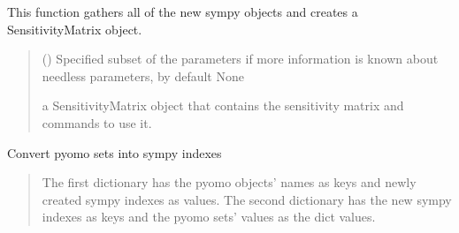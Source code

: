 \documentclass[letterpaper,10pt,english]{sphinxmanual}
\begin{document}
\begin{fulllineitems}
\begin{fulllineitems}
\label{\detokenize{src.sensitivity.faster_sensitivity:src.sensitivity.faster_sensitivity.AutoSympy.get_sensitivity_matrix}}
\pysigstartsignatures
\pysiglinewithargsret
{}
{}
{}
\pysigstopsignatures
\sphinxAtStartPar
This function gathers all of the new sympy objects and creates a SensitivityMatrix object.
\begin{quote}\begin{description}
\sphinxAtStartPar
{} (\sphinxstyleliteralemphasis{\sphinxupquote{, }}) \textendash{} Specified subset of the parameters if more information is known about needless parameters, by default None

\sphinxAtStartPar
a SensitivityMatrix object that contains the sensitivity matrix and commands to use it.

\sphinxAtStartPar
{\hyperref[\detokenize{src.sensitivity.faster_sensitivity:src.sensitivity.faster_sensitivity.SensitivityMatrix}]{}}

\end{description}\end{quote}

\end{fulllineitems}


\begin{fulllineitems}
\label{\detokenize{src.sensitivity.faster_sensitivity:src.sensitivity.faster_sensitivity.AutoSympy.get_sets}}
\pysigstartsignatures
\pysiglinewithargsret
{}
{}
{}
\pysigstopsignatures
\sphinxAtStartPar
Convert pyomo sets into sympy indexes
\begin{quote}\begin{description}
\sphinxAtStartPar
The first dictionary has the pyomo objects’ names as keys and newly created sympy indexes as values.
The second dictionary has the new sympy indexes as keys and the pyomo sets’ values as the dict values.


\end{description}
\end{quote}
\end{fulllineitems}
\end{fulllineitems}
\end{document}
